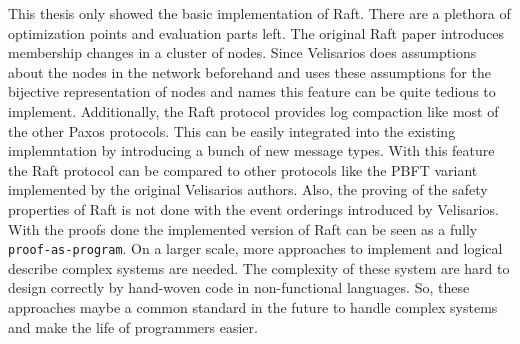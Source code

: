 This thesis only showed the basic implementation of
Raft. There are a plethora of optimization points
and evaluation parts left. The original Raft paper
introduces membership changes in a cluster of nodes.
Since Velisarios does assumptions about the nodes
in the network beforehand and uses these assumptions
for the bijective representation of nodes and names
this feature can be quite tedious to implement.
Additionally, the Raft protocol provides log
compaction like most of the other Paxos protocols.
This can be easily integrated into the existing
implemntation by introducing a bunch of new message
types. With this feature the Raft protocol can be
compared to other protocols like the PBFT variant
implemented by the original Velisarios authors.
Also, the proving of the safety properties of
Raft is not done with the event orderings
introduced by Velisarios. With the proofs
done the implemented version of Raft
can be seen as a fully \texttt{proof-as-program}.
On a larger scale, more approaches to implement and
logical describe complex systems are needed. The
complexity of these system are hard to design
correctly by hand-woven code in non-functional
languages. So, these approaches maybe a common
standard in the future to handle complex systems
and make the life of programmers easier.


